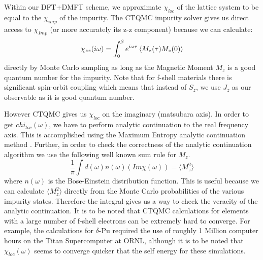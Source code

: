 \documentclass[10pt]{ruthesis}
\begin{document}
{Within our DFT+DMFT scheme, we approximate $\chi_{loc}$ of the lattice system to be equal to the $\chi_{imp}$ of the impurity. The CTQMC impurity solver gives us  direct access to $\chi_{Imp}$ (or more accurately its z-z component) because we can calculate:
\begin{equation}
\chi_{zz}(i\omega)=\int_0^\beta e^{i\omega\tau} \braket{ M_z(\tau)  M_z(0)} 
\end{equation}
directly by Monte Carlo sampling as long as the Magnetic Moment $M_z$ is a good quantum number for the impurity. Note that for f-shell materials there is significant spin-orbit coupling which means that instead of $S_z$, we use $J_z$ as our observable as it is good quantum number. 

However CTQMC gives us $\chi_{loc}$ on the imaginary (matsubara axis). In order to get $chi_{loc}(\omega)$, we have to perform analytic continuation to the real frequency axis. This is accomplished using the Maximum Entropy analytic continuation method  \cite{PhysicsReports_MEM_1996_M.Jarrell}. Further, in order to check the correctness of the analytic continuation algorithm we use the following well known sum rule for $M_z$.
\begin{equation}\label{sum rule}
\dfrac{1}{\pi}\int d(\omega) n(\omega) (Im \chi(\omega))= \langle M_{z}^{2} \rangle
\end{equation}
where $n(\omega)$ is the Bose-Einstein distribution function. This is useful because we can calculate $\langle M_{z}^{2} \rangle$ directly from the Monte Carlo probabilities of the various impurity states. Therefore the integral gives us a way to check the veracity of the analytic continuation. It is to be noted that CTQMC calculations for elements with a large number of f-shell electrons can be extremely hard to converge. For example, the calculations for $\delta$-Pu required the use of roughly 1 Million computer hours on the Titan Supercomputer at ORNL, although it is to be noted that $\chi_{loc}(\omega)$ seems to converge quicker that the self energy for these simulations.

}
\end{document}
